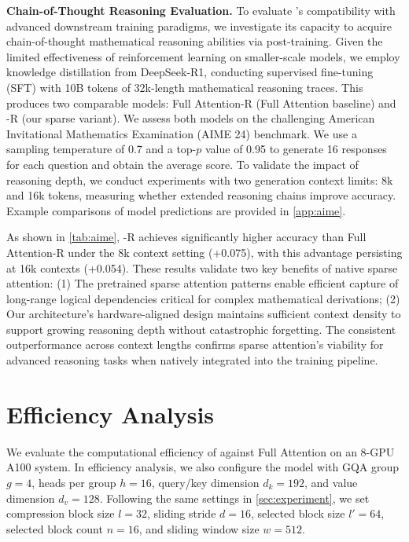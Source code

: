 \textbf{Chain-of-Thought Reasoning Evaluation.}  
To evaluate \method{}'s compatibility with advanced downstream training paradigms, we investigate its capacity to acquire chain-of-thought mathematical reasoning abilities via post-training. 
Given the limited effectiveness of reinforcement learning on smaller-scale models, we employ knowledge distillation from DeepSeek-R1, conducting supervised fine-tuning (SFT) with 10B tokens of 32k-length mathematical reasoning traces. This produces two comparable models: Full Attention-R (Full Attention baseline) and \method{}-R (our sparse variant). We assess both models on the challenging American Invitational Mathematics Examination (AIME 24) benchmark. We use a sampling temperature of 0.7 and a top-$p$ value of 0.95 to generate 16 responses for each question and obtain the average score. To validate the impact of reasoning depth, we conduct experiments with two generation context limits: 8k and 16k tokens, measuring whether extended reasoning chains improve accuracy. Example comparisons of model predictions are provided in \cref{app:aime}.


As shown in \cref{tab:aime}, \method{}-R achieves significantly higher accuracy than Full Attention-R under the 8k context setting (+0.075), with this advantage persisting at 16k contexts (+0.054).
These results validate two key benefits of native sparse attention: (1) The pretrained sparse attention patterns enable efficient capture of long-range logical dependencies critical for complex mathematical derivations; (2) Our architecture's hardware-aligned design maintains sufficient context density to support growing reasoning depth without catastrophic forgetting. The consistent outperformance across context lengths confirms sparse attention's viability for advanced reasoning tasks when natively integrated into the training pipeline.


\section{Efficiency Analysis }
\label{sec:time_comparsion}
We evaluate the computational efficiency of \method{} against Full Attention on an 8-GPU A100 system. In efficiency analysis, we also configure the model with GQA group $g=4$, heads per group $h=16$, query/key dimension $d_k=192$, and value dimension $d_v=128$. 
Following the same settings in \cref{sec:experiment}, we set \method{} compression block size $l=32$, sliding stride $d=16$, selected block size $l'=64$, selected block count $n=16$, and sliding window size $w=512$.

